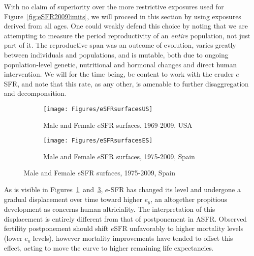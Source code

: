 With no claim of superiority over the more
restrictive exposures used for Figure~\ref{fig:eSFR2009limits}, we will proceed
in this section by using exposures derived from all ages. One could weakly
defend this choice by noting that we are attempting to measure the period
reproductivity of an \textit{entire} population, not just part of it. The
reproductive span was an outcome of evolution, varies greatly between
individuals and populations, and is mutable, both due to ongoing
population-level genetic, nutritional and hormonal changes and direct human
intervention. We will for the time being, be content to work with the cruder $e$SFR, and note
that this rate, as any other, is amenable to further disaggregation and
decomponsition.

\begin{figure}
        \centering
        \begin{subfigure}
                \centering
                \caption{Male and Female $e$SFR surfaces, 1969-2009, USA}
                \texttt{[image: Figures/eSFRsurfacesUS]}
                \label{fig:exSFRsurfUS}
        \end{subfigure}
        \begin{subfigure}
                \centering
                \caption{Male and Female $e$SFR surfaces, 1975-2009, Spain}
                \texttt{[image: Figures/eSFRsurfacesES]} 
                \label{fig:exSFRsurfES}
        \end{subfigure}
\end{figure}

As is visible in Figures~\ref{fig:exSFRsurfUS}~and~\ref{fig:exSFRsurfES}, 
$e$-SFR has changed its level and undergone a gradual displacement over 
time toward higher $e_y$, an altogether propitious development
as concerns human altriciality. The interpretation of this displacement is
entirely different from that of postponement in ASFR. Observed fertility 
postponement should shift $e$SFR unfavorably to higher mortality 
levels (lower $e_y$ levels), however mortality improvements have tended to 
offset this effect, acting to move the curve to higher
remaining life expectancies. 

 \FloatBarrier